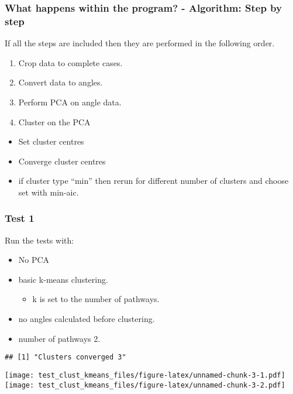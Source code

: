 \documentclass[
]{article}
\providecommand{\tightlist}{%
  \setlength{\itemsep}{0pt}\setlength{\parskip}{0pt}}
\begin{document}
\hypertarget{alg_steps}{%
\subsubsection{What happens within the program? - Algorithm: Step by
step}\label{alg_steps}}

If all the steps are included then they are performed in the following
order.

\begin{enumerate}
\def\labelenumi{\arabic{enumi}.}
\tightlist
\item
  Crop data to complete cases.
\item
  Convert data to angles.
\item
  Perform PCA on angle data.
\item
  Cluster on the PCA
\end{enumerate}

\begin{itemize}
\tightlist
\item
  Set cluster centres
\item
  Converge cluster centres
\item
  if cluster type ``min'' then rerun for different number of clusters
  and choose set with min-aic.
\end{itemize}

\hypertarget{test1}{%
\subsubsection{Test 1}\label{test1}}

Run the tests with:

\begin{itemize}
\tightlist
\item
  No PCA
\item
  basic k-means clustering.

  \begin{itemize}
  \tightlist
  \item
    k is set to the number of pathways.
  \end{itemize}
\item
  no angles calculated before clustering.
\item
  number of pathways 2.
\end{itemize}

\begin{verbatim}
## [1] "Clusters converged 3"
\end{verbatim}

\texttt{[image: test\_clust\_kmeans\_files/figure-latex/unnamed-chunk-3-1.pdf]}
\texttt{[image: test\_clust\_kmeans\_files/figure-latex/unnamed-chunk-3-2.pdf]}
\end{document}
